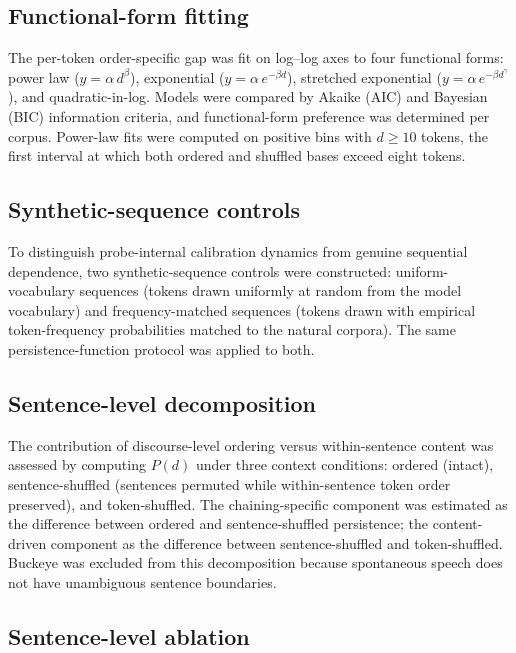 \documentclass[11pt]{article}
\begin{document}
\subsection{Functional-form fitting}

The per-token order-specific gap was fit on log--log axes to four functional forms: power law
($y = \alpha\, d^{\beta}$), exponential ($y = \alpha\, e^{-\beta d}$), stretched exponential
($y = \alpha\, e^{-\beta d^{\gamma}}$), and quadratic-in-log. Models were compared by Akaike (AIC)
and Bayesian (BIC) information criteria, and functional-form preference was determined per corpus.
Power-law fits were computed on positive bins with $d \geq 10$ tokens, the first interval at which
both ordered and shuffled bases exceed eight tokens.

\subsection{Synthetic-sequence controls}

To distinguish probe-internal calibration dynamics from genuine sequential dependence, two
synthetic-sequence controls were constructed: uniform-vocabulary sequences (tokens drawn uniformly
at random from the model vocabulary) and frequency-matched sequences (tokens drawn with empirical
token-frequency probabilities matched to the natural corpora). The same persistence-function
protocol was applied to both.

\subsection{Sentence-level decomposition}

The contribution of discourse-level ordering versus within-sentence content was assessed by
computing $P(d)$ under three context conditions: ordered (intact), sentence-shuffled (sentences
permuted while within-sentence token order preserved), and token-shuffled. The chaining-specific
component was estimated as the difference between ordered and sentence-shuffled persistence; the
content-driven component as the difference between sentence-shuffled and token-shuffled. Buckeye
was excluded from this decomposition because spontaneous speech does not have unambiguous sentence
boundaries.

\subsection{Sentence-level ablation}
\end{document}
